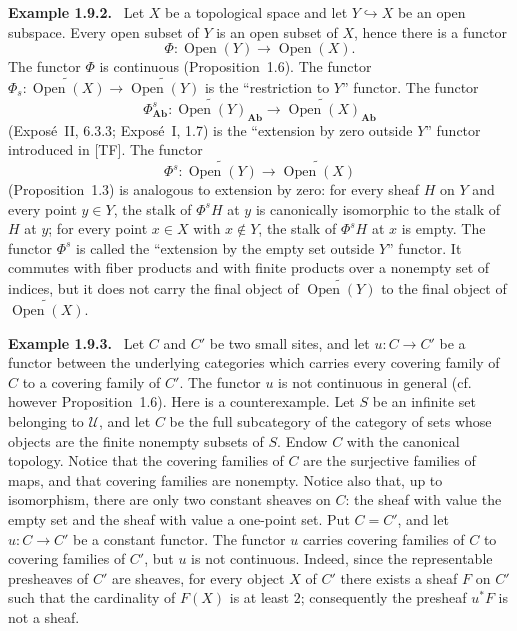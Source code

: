 \documentclass[11pt]{article}
\newcommand{\U}{\mathcal{U}}
\newcommand{\Ab}{\mathbf{Ab}}
\newcommand{\Ouv}{\operatorname{Open}}
\newenvironment{remarktext}[1]{\par\medskip\noindent\textbf{#1.}\ }{\par\medskip}
\begin{document}
\begin{remarktext}{Example 1.9.2}
Let \(X\) be a topological space and let \(Y\hookrightarrow X\) be an open subspace. Every open subset of \(Y\) is an open subset of \(X\), hence there is a functor
\[
\Phi:\Ouv(Y)\to\Ouv(X).
\]
The functor \(\Phi\) is continuous (Proposition~1.6). The functor \(\Phi_s:\widetilde{\Ouv(X)}\to\widetilde{\Ouv(Y)}\) is the ``restriction to \(Y\)'' functor. The functor
\[
\Phi^s_{\Ab}:\widetilde{\Ouv(Y)}_{\Ab}\to\widetilde{\Ouv(X)}_{\Ab}
\]
(Expos\'e~II, 6.3.3; Expos\'e~I, 1.7) is the ``extension by zero outside \(Y\)'' functor introduced in [TF]. The functor
\[
\Phi^s:\widetilde{\Ouv(Y)}\to\widetilde{\Ouv(X)}
\]
(Proposition~1.3) is analogous to extension by zero: for every sheaf \(H\) on \(Y\) and every point \(y\in Y\), the stalk of \(\Phi^sH\) at \(y\) is canonically isomorphic to the stalk of \(H\) at \(y\); for every point \(x\in X\) with \(x\notin Y\), the stalk of \(\Phi^sH\) at \(x\) is empty. The functor \(\Phi^s\) is called the ``extension by the empty set outside \(Y\)'' functor. It commutes with fiber products and with finite products over a nonempty set of indices, but it does not carry the final object of \(\widetilde{\Ouv(Y)}\) to the final object of \(\widetilde{\Ouv(X)}\).
\end{remarktext}

\begin{remarktext}{Example 1.9.3}
Let \(C\) and \(C'\) be two small sites, and let \(u:C\to C'\) be a functor between the underlying categories which carries every covering family of \(C\) to a covering family of \(C'\). The functor \(u\) is not continuous in general (cf. however Proposition~1.6). Here is a counterexample. Let \(S\) be an infinite set belonging to \(\U\), and let \(C\) be the full subcategory of the category of sets whose objects are the finite nonempty subsets of \(S\). Endow \(C\) with the canonical topology. Notice that the covering families of \(C\) are the surjective families of maps, and that covering families are nonempty. Notice also that, up to isomorphism, there are only two constant sheaves on \(C\): the sheaf with value the empty set and the sheaf with value a one-point set. Put \(C=C'\), and let \(u:C\to C'\) be a constant functor. The functor \(u\) carries covering families of \(C\) to covering families of \(C'\), but \(u\) is not continuous. Indeed, since the representable presheaves of \(C'\) are sheaves, for every object \(X\) of \(C'\) there exists a sheaf \(F\) on \(C'\) such that the cardinality of \(F(X)\) is at least \(2\); consequently the presheaf \(u^{\ast}F\) is not a sheaf.
\end{remarktext}
\end{document}
